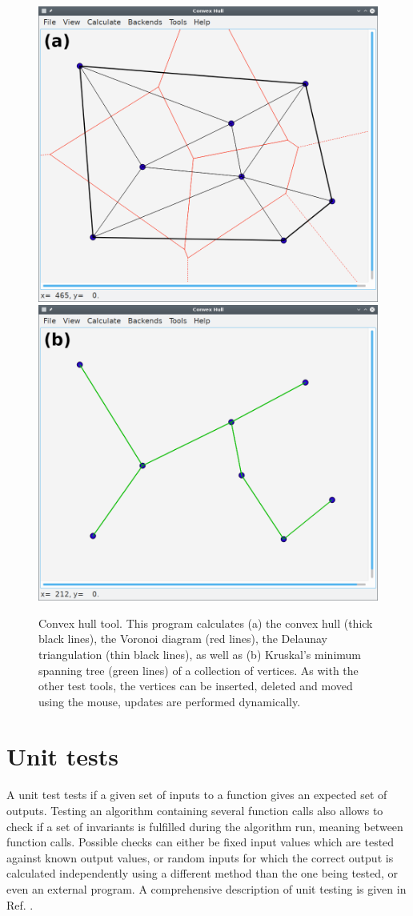 \begin{figure}[h]
	\centering
	\includegraphics[width = 0.49 \textwidth]{figures/hullgui_voro}
	\hspace{0.05cm}
	\includegraphics[width = 0.49 \textwidth]{figures/hullgui_kruskal}
	\caption[Convex hull tool.]{Convex hull tool.
		This program calculates 
		(a) the convex hull (thick black lines), the Voronoi diagram (red lines), 
			the Delaunay triangulation (thin black lines), as well as
		(b) Kruskal's minimum spanning tree (green lines)
		of a collection of vertices.
		As with the other test tools, the vertices can be inserted, deleted and moved 
		using the mouse, updates are performed dynamically.
		\label{fig:hullgui}}
\end{figure}




\section{Unit tests}
\label{sec:unit_tests}
A unit test tests if a given set of inputs to a function gives an expected set of outputs.
Testing an algorithm containing several function calls also allows to check if a set of invariants
is fulfilled during the algorithm run, meaning between function calls.
Possible checks can either be fixed input values which are tested against known output values,
or random inputs for which the correct output is calculated independently using a different 
method than the one being tested, or even an external program.
A comprehensive description of unit testing is given in Ref. \cite[Ch. 3, pp. 84-127]{FUH_prog2019}.

